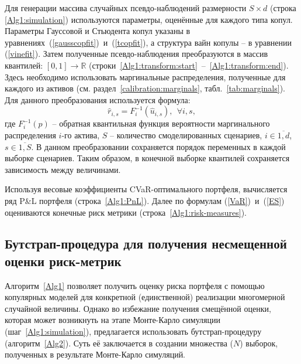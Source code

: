 Для генерации массива случайных псевдо-наблюдений размерности \mbox{$S \times d$} (строка \ref{Alg1:simulation}) используются параметры, оценённые для каждого типа копул.
Параметры Гауссовой и Стьюдента копул указаны в уравнениях~(\ref{gausscopfit})~и~(\ref{tcopfit}), а структура вайн копулы -- в уравнении (\ref{vinefit}).
Затем полученные псевдо-наблюдения преобразуются в массив квантилей: $[0,1] \to \mathbb{R}$ (строки~\ref{Alg1:transform:start}~--~\ref{Alg1:transform:end}). Здесь необходимо использовать маргинальные распределения, полученные для каждого из активов (см. раздел~\ref{calibration:marginals}, табл.~\ref{tab:marginals}).
Для данного преобразования используется формула:
\begin{equation} \label{pobs-to-qtile}
    \hat{r}_{i,s} = F^{-1}_i (\hat{u}_{i,s}), \ \
    \forall i, s,
\end{equation}
где $F^{-1}_i (p)$ -- обратная квантильная функция вероятности маргинального распределения $i$-го актива, $S$ -- количество смоделированных сценариев, $i \in \overline{1,d}$, $s \in \overline{1,S}$.
В данном преобразовании сохраняется порядок переменных в каждой выборке сценариев.
Таким образом, в конечной выборке квантилей сохраняется зависимость между величинами.

Используя весовые коэффициенты CVaR-оптимального портфеля, вычисляется ряд P\&L портфеля (строка~\ref{Alg1:PnL}). Далее по формулам (\ref{VaR})~и~(\ref{ES}) оцениваются конечные риск метрики (строка~\ref{Alg1:risk-measures}).

\subsection{Бутстрап-процедура для получения несмещенной оценки риск-метрик}
\label{methodology:bootstrap}

Алгоритм~\ref{Alg1} позволяет получить оценку риска портфеля с помощью копулярных моделей для конкретной (единственной) реализации многомерной случайной величины. 
Однако во избежание получения %
смещённой оценки, которая может возникнуть на этапе Монте-Карло симуляции (шаг~\ref{Alg1:simulation}), предлагается использовать бутстрап-процедуру (алгоритм~\ref{Alg2}).
Суть её заключается в создании множества ($N$) выборок, полученных в результате Монте-Карло симуляций.

